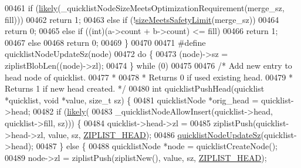 \begin{DoxyCode}
{00461     \textcolor{keywordflow}{if} (\hyperlink{quicklist_8c_a217a0bd562b98ae8c2ffce44935351e1}{likely}(\_quicklistNodeSizeMeetsOptimizationRequirement(merge\_sz, fill)))
00462         \textcolor{keywordflow}{return} 1;
00463     \textcolor{keywordflow}{else} \textcolor{keywordflow}{if} (!\hyperlink{quicklist_8c_ab77edec9f8d4ebc2917da86841a5f202}{sizeMeetsSafetyLimit}(merge\_sz))
00464         \textcolor{keywordflow}{return} 0;
00465     \textcolor{keywordflow}{else} \textcolor{keywordflow}{if} ((\textcolor{keywordtype}{int})(a->count + b->count) <= fill)
00466         \textcolor{keywordflow}{return} 1;
00467     \textcolor{keywordflow}{else}
00468         \textcolor{keywordflow}{return} 0;
00469 \}
00470 
00471 \textcolor{preprocessor}{#}\textcolor{preprocessor}{define} \textcolor{preprocessor}{quicklistNodeUpdateSz}\textcolor{preprocessor}{(}\textcolor{preprocessor}{node}\textcolor{preprocessor}{)}
00472     \textcolor{keywordflow}{do} \textcolor{preprocessor}{\{}
00473         \textcolor{preprocessor}{(}\textcolor{preprocessor}{node}\textcolor{preprocessor}{)}\textcolor{preprocessor}{->}\textcolor{preprocessor}{sz} \textcolor{preprocessor}{=} \textcolor{preprocessor}{ziplistBlobLen}\textcolor{preprocessor}{(}\textcolor{preprocessor}{(}\textcolor{preprocessor}{node}\textcolor{preprocessor}{)}\textcolor{preprocessor}{->}\textcolor{preprocessor}{zl}\textcolor{preprocessor}{)}\textcolor{preprocessor}{;}
00474     \textcolor{preprocessor}{\}} \textcolor{keywordflow}{while} \textcolor{preprocessor}{(}0\textcolor{preprocessor}{)}
00475 
00476 \textcolor{comment}{/* Add new entry to head node of quicklist.}
00477 \textcolor{comment}{ *}
00478 \textcolor{comment}{ * Returns 0 if used existing head.}
00479 \textcolor{comment}{ * Returns 1 if new head created. */}
00480 \textcolor{keywordtype}{int} quicklistPushHead(quicklist *quicklist, \textcolor{keywordtype}{void} *value, size\_t sz) \{
00481     quicklistNode *orig\_head = quicklist->head;
00482     \textcolor{keywordflow}{if} (\hyperlink{quicklist_8c_a217a0bd562b98ae8c2ffce44935351e1}{likely}(
00483             \_quicklistNodeAllowInsert(quicklist->head, quicklist->fill, sz))) \{
00484         quicklist->head->zl =
00485             ziplistPush(quicklist->head->zl, value, sz, \hyperlink{ziplist_8h_a88d32e547c509220e1c50cd9306186ba}{ZIPLIST\_HEAD});
00486         \hyperlink{quicklist_8c_a03a3947a9423d234923343702619c553}{quicklistNodeUpdateSz}(quicklist->head);
00487     \} \textcolor{keywordflow}{else} \{
00488         quicklistNode *node = quicklistCreateNode();
00489         node->zl = ziplistPush(ziplistNew(), value, sz, \hyperlink{ziplist_8h_a88d32e547c509220e1c50cd9306186ba}{ZIPLIST\_HEAD});
}
\end{DoxyCode}

